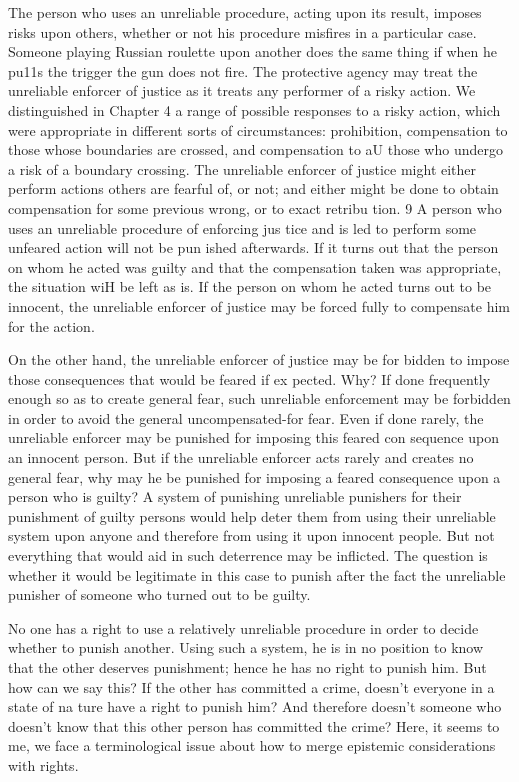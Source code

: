 \documentclass[11pt,openany]{book}
\begin{document}
The person who uses an unreliable procedure, acting upon its result, imposes risks upon others, whether or not his procedure misfires in a particular case. Someone playing Russian roulette upon another does the same thing if when he pu11s the trigger the gun does not fire. The protective agency may treat the unreliable enforcer of justice as it treats any performer of a risky action. We distinguished in Chapter 4 a range of possible responses to a risky action, which were appropriate in different sorts of circumstances: prohibition, compensation to those whose boundaries are crossed, and compensation to aU those who undergo a risk of a boundary crossing. The unreliable enforcer of justice might either perform actions others are fearful of, or not; and either might be done to obtain compensation for some previous wrong, or to exact retribu tion. 9 A person who uses an unreliable procedure of enforcing jus tice and is led to perform some unfeared action will not be pun ished afterwards. If it turns out that the person on whom he acted was guilty and that the compensation taken was appropriate, the situation wiH be left as is. If the person on whom he acted turns out to be innocent, the unreliable enforcer of justice may be forced fully to compensate him for the action. 

On the other hand, the unreliable enforcer of justice may be for bidden to impose those consequences that would be feared if ex pected. Why? If done frequently enough so as to create general fear, such unreliable enforcement may be forbidden in order to avoid the general uncompensated-for fear. Even if done rarely, the unreliable enforcer may be punished for imposing this feared con sequence upon an innocent person. But if the unreliable enforcer acts rarely and creates no general fear, why may he be punished for imposing a feared consequence upon a person who is guilty? A system of punishing unreliable punishers for their punishment of guilty persons would help deter them from using their unreliable system upon anyone and therefore from using it upon innocent people. But not everything that would aid in such deterrence may be inflicted. The question is whether it would be legitimate in this case to punish after the fact the unreliable punisher of someone who turned out to be guilty. 

No one has a right to use a relatively unreliable procedure in order to decide whether to punish another. Using such a system, he is in no position to know that the other deserves punishment; hence he has no right to punish him. But how can we say this? If the other has committed a crime, doesn't everyone in a state of na ture have a right to punish him? And therefore doesn't someone who doesn't know that this other person has committed the crime? Here, it seems to me, we face a terminological issue about how to merge epistemic considerations with rights. 
\end{document}
